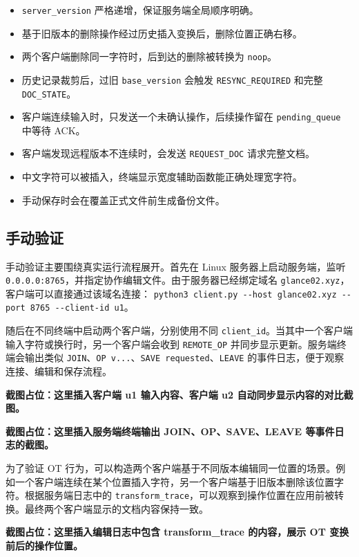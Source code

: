 \begin{itemize}
  \item \verb|server_version| 严格递增，保证服务端全局顺序明确。
  \item 基于旧版本的删除操作经过历史插入变换后，删除位置正确右移。
  \item 两个客户端删除同一字符时，后到达的删除被转换为 \verb|noop|。
  \item 历史记录裁剪后，过旧 \verb|base_version| 会触发 \verb|RESYNC_REQUIRED| 和完整 \verb|DOC_STATE|。
  \item 客户端连续输入时，只发送一个未确认操作，后续操作留在 \verb|pending_queue| 中等待 ACK。
  \item 客户端发现远程版本不连续时，会发送 \verb|REQUEST_DOC| 请求完整文档。
  \item 中文字符可以被插入，终端显示宽度辅助函数能正确处理宽字符。
  \item 手动保存时会在覆盖正式文件前生成备份文件。
\end{itemize}

\subsection{手动验证}

手动验证主要围绕真实运行流程展开。首先在 Linux 服务器上启动服务端，监听 \verb|0.0.0.0:8765|，并指定协作编辑文件。由于服务器已经绑定域名 \verb|glance02.xyz|，客户端可以直接通过该域名连接：
\verb|python3 client.py --host glance02.xyz --port 8765 --client-id u1|。

随后在不同终端中启动两个客户端，分别使用不同 \verb|client_id|。当其中一个客户端输入字符或换行时，另一个客户端会收到 \verb|REMOTE_OP| 并同步显示更新。服务端终端会输出类似 \verb|JOIN|、\verb|OP v...|、\verb|SAVE requested|、\verb|LEAVE| 的事件日志，便于观察连接、编辑和保存流程。

\textbf{截图占位：这里插入客户端 u1 输入内容、客户端 u2 自动同步显示内容的对比截图。}

\textbf{截图占位：这里插入服务端终端输出 JOIN、OP、SAVE、LEAVE 等事件日志的截图。}

为了验证 OT 行为，可以构造两个客户端基于不同版本编辑同一位置的场景。例如一个客户端连续在某个位置插入字符，另一个客户端基于旧版本删除该位置字符。根据服务端日志中的 \verb|transform_trace|，可以观察到操作位置在应用前被转换。最终两个客户端显示的文档内容保持一致。

\textbf{截图占位：这里插入编辑日志中包含 transform\_trace 的内容，展示 OT 变换前后的操作位置。}

